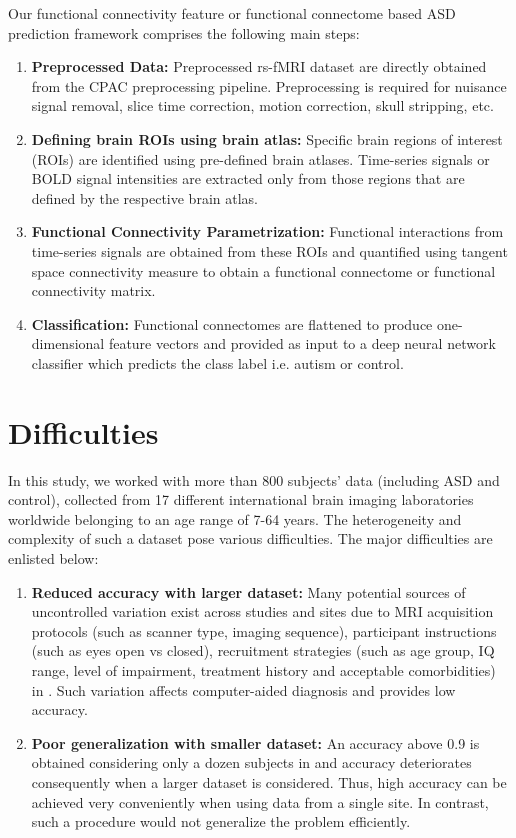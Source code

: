 Our functional connectivity feature or functional connectome based ASD prediction framework comprises the following main
steps:\\
\begin{enumerate}
\item \textbf{Preprocessed Data:} Preprocessed rs-fMRI dataset are directly obtained from the CPAC preprocessing pipeline. Preprocessing is required for
nuisance signal removal, slice time correction, motion correction, skull stripping, etc.
\item \textbf{Defining brain ROIs using brain atlas:} Specific brain regions of interest (ROIs) are identified using
pre-defined brain atlases. Time-series signals or BOLD signal intensities are extracted only
from those regions that are defined by the respective brain atlas.
\item \textbf{Functional Connectivity Parametrization:} Functional interactions from time-series signals are
obtained from these ROIs and quantified using tangent space connectivity measure to
obtain a functional connectome or functional connectivity matrix.
\item \textbf{Classification:} Functional connectomes are flattened to produce one-dimensional
feature vectors and provided as input to a deep neural network classifier which predicts the class label i.e. autism or control.
\end{enumerate}


\section{Difficulties}
In this study, we worked with more than 800 subjects’ data (including ASD and control),
collected from 17 different international brain imaging laboratories worldwide belonging to
an age range of 7-64 years. The heterogeneity and complexity of such a dataset pose various
difficulties. The major difficulties are enlisted below:\\

\begin{enumerate}
\item \textbf{Reduced accuracy with larger dataset:} Many potential sources of uncontrolled
variation exist across studies and sites due to MRI acquisition protocols (such as
scanner type, imaging sequence), participant instructions (such as eyes open vs
closed), recruitment strategies (such as age group, IQ range, level of impairment,
treatment history and acceptable comorbidities) in \cite{abraham2017deriving}. Such variation affects
computer-aided diagnosis and provides low accuracy.

\item \textbf{Poor generalization with smaller dataset:} An accuracy above 0.9 is obtained
considering only a dozen subjects in \cite{arbabshirani2017single} and accuracy deteriorates consequently when
a larger dataset is considered. Thus, high accuracy can be achieved very conveniently
when using data from a single site. In contrast, such a procedure would not generalize
the problem efficiently.
\end{enumerate}

